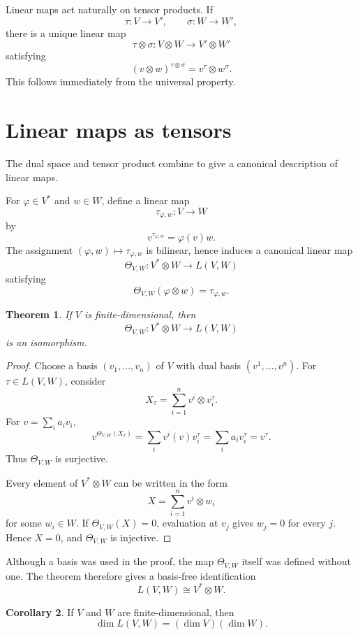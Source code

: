\documentclass{amsbook}
\newtheorem{theorem}{Theorem}[chapter]
\theoremstyle{definition}
\newtheorem{corollary}[theorem]{Corollary}
\theoremstyle{remark}
\numberwithin{section}{chapter}
\numberwithin{equation}{chapter}
\begin{document}
Linear maps act naturally on tensor products. If
\[
\tau\colon V\to V',
\qquad
\sigma\colon W\to W',
\]
there is a unique linear map
\[
\tau\otimes\sigma\colon V\otimes W\to V'\otimes W'
\]
satisfying
\[
(v\otimes w)^{\tau\otimes\sigma}=v^\tau\otimes w^\sigma.
\]
This follows immediately from the universal property.

\section{Linear maps as tensors}

The dual space and tensor product combine to give a canonical description of linear maps.

For $\varphi\in V^*$ and $w\in W$, define a linear map
\[
\tau_{\varphi,w}\colon V\to W
\]
by
\[
v^{\tau_{\varphi,w}}=\varphi(v)w.
\]
The assignment $(\varphi,w)\mapsto\tau_{\varphi,w}$ is bilinear, hence induces a canonical linear map
\[
\Theta_{V,W}\colon V^*\otimes W\longrightarrow L(V,W)
\]
satisfying
\[
\Theta_{V,W}(\varphi\otimes w)=\tau_{\varphi,w}.
\]

\begin{theorem}\label{thm:hom-tensor}
If $V$ is finite-dimensional, then
\[
\Theta_{V,W}\colon V^*\otimes W\longrightarrow L(V,W)
\]
is an isomorphism.
\end{theorem}

\begin{proof}
Choose a basis $(v_1,\dots,v_n)$ of $V$ with dual basis $(v^1,\dots,v^n)$. For $\tau\in L(V,W)$, consider
\[
X_\tau=\sum_{i=1}^n v^i\otimes v_i^\tau.
\]
For $v=\sum_i a_iv_i$,
\[
v^{\Theta_{V,W}(X_\tau)}
=
\sum_i v^i(v)v_i^\tau
=
\sum_i a_iv_i^\tau
=
v^\tau.
\]
Thus $\Theta_{V,W}$ is surjective.

Every element of $V^*\otimes W$ can be written in the form
\[
X=\sum_{i=1}^n v^i\otimes w_i
\]
for some $w_i\in W$. If $\Theta_{V,W}(X)=0$, evaluation at $v_j$ gives $w_j=0$ for every $j$. Hence $X=0$, and $\Theta_{V,W}$ is injective.
\end{proof}

Although a basis was used in the proof, the map $\Theta_{V,W}$ itself was defined without one. The theorem therefore gives a basis-free identification
\[
\boxed{L(V,W)\cong V^*\otimes W.}
\]

\begin{corollary}\label{cor:hom-dimension}
If $V$ and $W$ are finite-dimensional, then
\[
\dim L(V,W)=(\dim V)(\dim W).
\]
\end{corollary}
\end{document}
